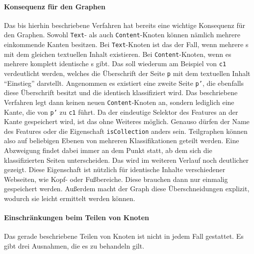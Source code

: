     \paragraph{Konsequenz für den Graphen}
    Das bis hierhin beschriebene Verfahren hat bereits eine wichtige
    Konsequenz für den Graphen.
    Sowohl \texttt{Text}- als auch \texttt{Content}-Knoten können nämlich mehrere einkommende Kanten besitzen.
    Bei \texttt{Text}-Knoten ist das der Fall, wenn mehrere {\contentFeature}s mit dem gleichen textuellen Inhalt existieren.
    Bei \texttt{Content}-Knoten, wenn es mehrere komplett identische {\contentFeature}s gibt.
    Das soll wiederum am Beispiel von \texttt{c1} verdeutlicht werden,
    welches die Überschrift der Seite \texttt{p} mit dem textuellen Inhalt "`Einstieg"' darstellt.
    Angenommen es existiert eine zweite Seite \texttt{p'},
    die ebenfalls diese Überschrift besitzt und die identisch klassifiziert wird.
    Das beschriebene Verfahren legt dann keinen neuen \texttt{Content}-Knoten an,
    sondern lediglich eine Kante, die von \texttt{p'} zu \texttt{c1} führt.
    Da der eindeutige Selektor des Features an der Kante gespeichert wird, ist das ohne Weiteres möglich.
    Genauso dürfen der Name des Features oder die Eigenschaft \texttt{isCollection} anders sein.
    Teilgraphen können also auf beliebigen Ebenen von mehreren Klassifikationen geteilt werden.
    Eine Abzweigung findet dabei immer an dem Punkt statt,
    ab dem sich die klassifizierten Seiten unterscheiden.
    Das wird im weiteren Verlauf noch deutlicher gezeigt.    
    Diese Eigenschaft ist nützlich für identische Inhalte
    verschiedener Webseiten, wie Kopf- oder Fußbereiche.
    Diese brauchen dann nur einmalig gespeichert werden.
    Außerdem macht der Graph diese Überschneidungen explizit, wodurch sie leicht
    ermittelt werden können.

    \paragraph{Einschränkungen beim Teilen von Knoten}
    Das gerade beschriebene Teilen von Knoten ist nicht in jedem Fall gestattet.
    Es gibt drei Ausnahmen, die es zu behandeln gilt.

